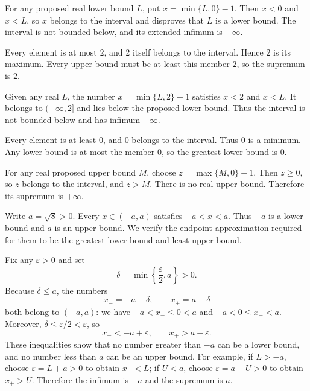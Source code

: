 For any proposed real lower bound $L$, put
$x=\min\{L,0\}-1$. Then $x<0$ and $x<L$, so $x$ belongs to the
interval and disproves that $L$ is a lower bound. The interval is not
bounded below, and its extended infimum is $-\infty$.

\step{2. Part (b): The interval $(-\infty,2]$}
Every element is at most $2$, and $2$ itself belongs to the interval.
Hence $2$ is its maximum. Every upper bound must be at least this
member $2$, so the supremum is $2$.

Given any real $L$, the number $x=\min\{L,2\}-1$ satisfies $x<2$
and $x<L$. It belongs to $(-\infty,2]$ and lies below the proposed
lower bound. Thus the interval is not bounded below and has infimum
$-\infty$.

\step{3. Part (c): The interval $[0,+\infty)$}
Every element is at least $0$, and $0$ belongs to the interval.
Thus $0$ is a minimum. Any lower bound is at most the member $0$,
so the greatest lower bound is $0$.

For any real proposed upper bound $M$, choose
$z=\max\{M,0\}+1$. Then $z\ge0$, so $z$ belongs to the interval,
and $z>M$. There is no real upper bound. Therefore its supremum is
$+\infty$.

Write $a=\sqrt8>0$. Every $x\in(-a,a)$ satisfies $-a<x<a$.
Thus $-a$ is a lower bound and $a$ is an upper bound. We verify
the endpoint approximation required for them to be the greatest
lower bound and least upper bound.

Fix any $\varepsilon>0$ and set
\[
 \delta=\min\left\{\frac{\varepsilon}{2},a\right\}>0.
\]
Because $\delta\le a$, the numbers
\[
 x_-=-a+\delta,\qquad x_+=a-\delta
\]
both belong to $(-a,a)$: we have $-a<x_-\le0<a$ and
$-a<0\le x_+<a$. Moreover, $\delta\le\varepsilon/2<\varepsilon$,
so
\[
 x_-<-a+\varepsilon,
 \qquad x_+>a-\varepsilon.
\]
These inequalities show that no number greater than $-a$ can be
a lower bound, and no number less than $a$ can be an upper bound.
For example, if $L>-a$, choose $\varepsilon=L+a>0$ to obtain
$x_-<L$; if $U<a$, choose $\varepsilon=a-U>0$ to obtain $x_+>U$.
Therefore the infimum is $-a$ and the supremum is $a$.


